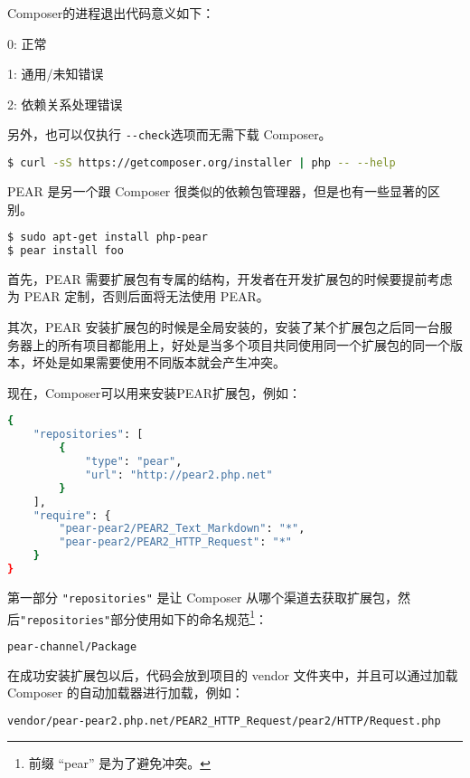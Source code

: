 Composer的进程退出代码意义如下：

\begin{compactitem}
\item 0: 正常
\item 1: 通用/未知错误
\item 2: 依赖关系处理错误
\end{compactitem}

另外，也可以仅执行 \texttt{-\/-check}选项而无需下载 Composer。 

\begin{lstlisting}[language=bash]
$ curl -sS https://getcomposer.org/installer | php -- --help
\end{lstlisting}

PEAR 是另一个跟 Composer 很类似的依赖包管理器，但是也有一些显著的区别。

\begin{lstlisting}[language=bash]
$ sudo apt-get install php-pear
$ pear install foo
\end{lstlisting}

首先，PEAR 需要扩展包有专属的结构，开发者在开发扩展包的时候要提前考虑为 PEAR 定制，否则后面将无法使用 PEAR。

其次，PEAR 安装扩展包的时候是全局安装的，安装了某个扩展包之后同一台服务器上的所有项目都能用上，好处是当多个项目共同使用同一个扩展包的同一个版本，坏处是如果需要使用不同版本就会产生冲突。

现在，Composer可以用来安装PEAR扩展包，例如：


\begin{lstlisting}[language=bash]
{
    "repositories": [
        {
            "type": "pear",
            "url": "http://pear2.php.net"
        }
    ],
    "require": {
        "pear-pear2/PEAR2_Text_Markdown": "*",
        "pear-pear2/PEAR2_HTTP_Request": "*"
    }
}
\end{lstlisting}

第一部分 \texttt{"repositories"} 是让 Composer 从哪个渠道去获取扩展包，然后\texttt{"repositories"}部分使用如下的命名规范\footnote{前缀 “pear” 是为了避免冲突。}：


\begin{lstlisting}[language=bash]
pear-channel/Package
\end{lstlisting}

在成功安装扩展包以后，代码会放到项目的 vendor 文件夹中，并且可以通过加载 Composer 的自动加载器进行加载，例如：

\begin{lstlisting}[language=bash]
vendor/pear-pear2.php.net/PEAR2_HTTP_Request/pear2/HTTP/Request.php
\end{lstlisting}

